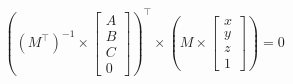 \documentclass{article}
\begin{document}
\thispagestyle{empty}

$$
\left( (M^{\top})^{-1}\times\begin{bmatrix}A \\ B \\ C \\ 0\end{bmatrix} \right)^\top\times \left(M \times \begin{bmatrix}x \\ y \\ z\\1\end{bmatrix}\right)  = 0
$$
\end{document}
